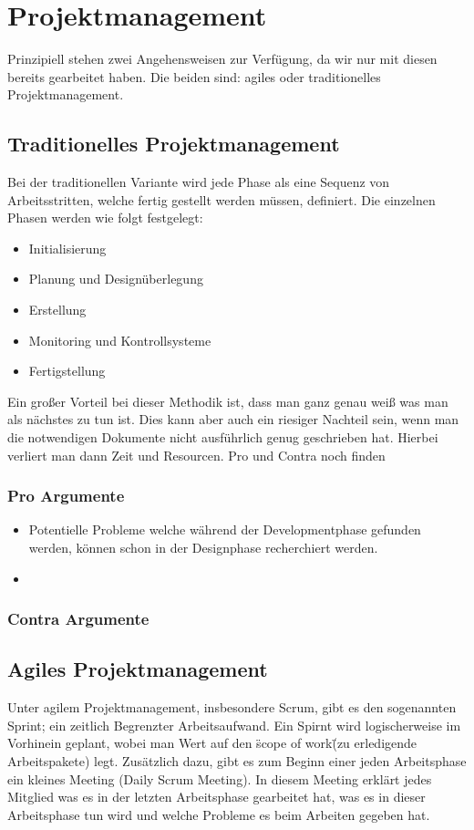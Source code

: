 \chapter{Projektmanagement}

Prinzipiell stehen zwei Angehensweisen zur Verfügung, da wir nur mit diesen bereits gearbeitet haben. Die beiden sind: agiles oder traditionelles Projektmanagement.

\section{Traditionelles Projektmanagement}
Bei der traditionellen Variante wird jede Phase als eine Sequenz von Arbeitsstritten, welche fertig gestellt werden müssen, definiert. Die einzelnen Phasen werden wie folgt festgelegt:
\begin{itemize}
		\item Initialisierung
		\item Planung und Designüberlegung
		\item Erstellung
		\item Monitoring und Kontrollsysteme
		\item Fertigstellung
\end{itemize}

Ein großer Vorteil bei dieser Methodik ist, dass man ganz genau weiß was man als nächstes zu tun ist. Dies kann aber auch ein riesiger Nachteil sein, wenn man die notwendigen Dokumente nicht ausführlich genug geschrieben hat. Hierbei verliert man dann Zeit und Resourcen.
\newpage
\todo Pro und Contra noch finden
\subsection{Pro Argumente}
\begin{itemize}
		\item Potentielle Probleme welche während der Developmentphase gefunden werden, können schon in der Designphase recherchiert werden.
		\item 
\end{itemize}

\subsection{Contra Argumente}


\section{Agiles Projektmanagement}
Unter agilem Projektmanagement, insbesondere Scrum, gibt es den sogenannten Sprint; ein zeitlich Begrenzter Arbeitsaufwand. Ein Spirnt wird logischerweise im Vorhinein geplant, wobei man Wert auf den \"scope of work\" (zu erledigende Arbeitspakete) legt. Zusätzlich dazu, gibt es zum Beginn einer jeden Arbeitsphase ein kleines Meeting (Daily Scrum Meeting). In diesem Meeting erklärt jedes Mitglied was es in der letzten Arbeitsphase gearbeitet hat, was es in dieser Arbeitsphase tun wird und welche Probleme es beim Arbeiten gegeben hat.

